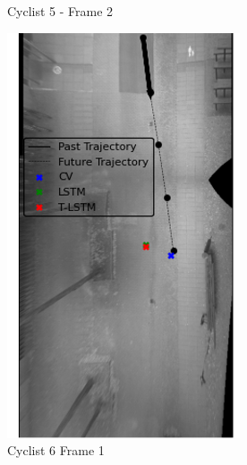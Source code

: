 \documentclass{article}
\begin{document}
\begin{figure}[H]
\begin{subfigure}{0.4\textwidth}
  \caption{Cyclist 5 - Frame 2}
  \label{fig:cyc5-2}
\end{subfigure}
\begin{subfigure}{0.40\textwidth}
  \centering
  \includegraphics[width=\linewidth]{quali_results/cyc-6-1.png}
  \caption{Cyclist 6 Frame 1}
  \label{fig:cyc6-1}
\end{subfigure}
\begin{subfigure}{0.40\textwidth}
  \centering

\end{subfigure}
\end{figure}
\end{document}
